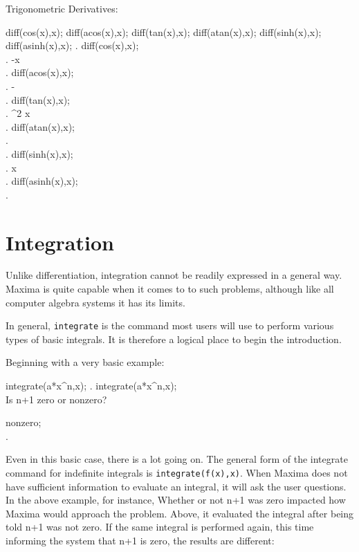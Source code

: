 Trigonometric Derivatives:

\beginmaximasession
diff(cos(x),x);
diff(acos(x),x);
diff(tan(x),x);
diff(atan(x),x);
diff(sinh(x),x);
diff(asinh(x),x);
\maximatexsession
{}.  diff(cos(x),x); \\
.  -\sin x \\
.  diff(acos(x),x); \\
.  - \\
.  diff(tan(x),x); \\
.  \sec ^{2 }x \\
.  diff(atan(x),x); \\
.   \\
.  diff(sinh(x),x); \\
.  \cosh x \\
.  diff(asinh(x),x); \\
.   \\
\endmaximasession

\section{Integration}

Unlike differentiation, integration cannot be readily expressed in a general
way.  Maxima is quite capable when it comes to to such problems, although
like all computer algebra systems it has its limits.

In general, {\tt integrate} is the command most users will use to perform
various types of basic integrals.  It is therefore a logical place to begin
the introduction.

Beginning with a very basic example:

\beginmaximasession
integrate(a*x^n,x);
\maximatexsession
{}.  integrate(a*x^n,x); \\
\p
Is  n+1  zero or nonzero?

nonzero; \\
.   \\
\endmaximasession

Even in this basic case, there is a lot going on.  The general form of 
the integrate command for indefinite integrals is {\tt integrate(f(x),x)}.
When Maxima does not have sufficient information to evaluate an integral,
it will ask the user questions.  In the above example, for instance,
Whether or not n+1 was zero impacted how Maxima would approach the problem.
Above, it evaluated the integral after being told n+1 was not zero. If
the same integral is performed again, this time informing the system that
n+1 is zero, the results are different:

